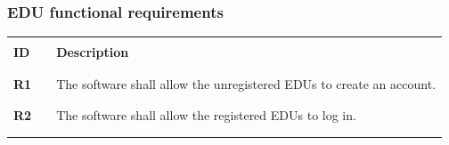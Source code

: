 \subsubsection*{EDU functional requirements}
\renewcommand{\arraystretch}{0.5}
\begin{longtable}[H]{l l p{12cm}}
    \hline
                 &        &                                                                                                                                                                                                                                                                                 \\
    \textbf{ID}  & \vline & \textbf{Description}                                                                                                                                                                                                                                                            \\
                 &        &                                                                                                                                                                                                                                                                                 \\\hline & & \\   
    \textbf{R1}  & \vline & The software shall allow the unregistered EDUs to create an account.                                                                                                                                                                                                            \\
                 &        &                                                                                                                                                                                                                                                                                 \\\hline & & \\
    \textbf{R2}  & \vline & The software shall allow the registered EDUs to log in.                                                                                                                                                                                                                         \\
                 &        &                                                                                                                                                                                                                                                                                 \\\hline & & \\

\end{longtable}
